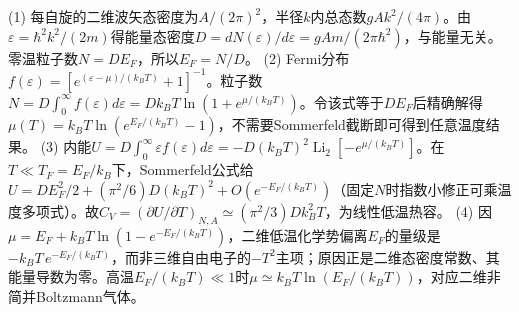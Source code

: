 (1) 每自旋的二维波矢态密度为\(A/(2\pi)^2\)，半径\(k\)内总态数\(gAk^2/(4\pi)\)。由\(\varepsilon=\hbar^2k^2/(2m)\)得能量态密度\(D=dN(\varepsilon)/d\varepsilon=gAm/(2\pi\hbar^2)\)，与能量无关。零温粒子数\(N=DE_F\)，所以\(E_F=N/D\)。
(2) Fermi分布\(f(\varepsilon)=[e^{(\varepsilon-\mu)/(k_BT)}+1]^{-1}\)。粒子数\(N=D\int_0^\infty f(\varepsilon)d\varepsilon=Dk_BT\ln(1+e^{\mu/(k_BT)})\)。令该式等于\(DE_F\)后精确解得\(\mu(T)=k_BT\ln(e^{E_F/(k_BT)}-1)\)，不需要Sommerfeld截断即可得到任意温度结果。
(3) 内能\(U=D\int_0^\infty\varepsilon f(\varepsilon)d\varepsilon=-D(k_BT)^2\operatorname{Li}_2[-e^{\mu/(k_BT)}]\)。在\(T\ll T_F=E_F/k_B\)下，Sommerfeld公式给\(U=DE_F^2/2+(\pi^2/6)D(k_BT)^2+O(e^{-E_F/(k_BT)})\)（固定\(N\)时指数小修正可乘温度多项式）。故\(C_V=(\partial U/\partial T)_{N,A}\simeq(\pi^2/3)Dk_B^2T\)，为线性低温热容。
(4) 因\(\mu=E_F+k_BT\ln(1-e^{-E_F/(k_BT)})\)，二维低温化学势偏离\(E_F\)的量级是\(-k_BT\,e^{-E_F/(k_BT)}\)，而非三维自由电子的\(-T^2\)主项；原因正是二维态密度常数、其能量导数为零。高温\(E_F/(k_BT)\ll1\)时\(\mu\simeq k_BT\ln(E_F/(k_BT))\)，对应二维非简并Boltzmann气体。
